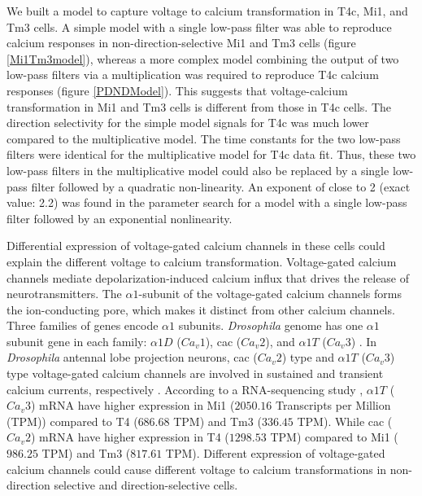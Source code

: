 \documentclass[9pt,lineno]{elife}
\begin{document}
We built a model to capture voltage to calcium transformation in T4c, Mi1, and Tm3 cells. A simple model with a single low-pass filter was able to reproduce calcium responses in non-direction-selective Mi1 and Tm3 cells (figure \ref{Mi1Tm3model}), whereas a more complex model combining the output of two low-pass filters via a multiplication was required to reproduce T4c calcium responses (figure \ref{PDNDModel}). This suggests that voltage-calcium transformation in Mi1 and Tm3 cells is different from those in T4c cells. The direction selectivity for the simple model signals for T4c was much lower compared to the multiplicative model. The time constants for the two low-pass filters were identical for the multiplicative model for T4c data fit. Thus, these two low-pass filters in the multiplicative model could also be replaced by a single low-pass filter followed by a quadratic non-linearity. An exponent of close to 2 (exact value: 2.2) was found in the parameter search for a model with a single low-pass filter followed by an exponential nonlinearity.  


Differential expression of voltage-gated calcium channels in these cells could explain the different voltage to calcium transformation. Voltage-gated calcium channels mediate depolarization-induced calcium influx that drives the release of neurotransmitters. The $\alpha1$-subunit of the voltage-gated calcium channels forms the ion-conducting pore, which makes it distinct from other calcium channels. Three families of genes encode $\alpha1$ subunits. \textit{Drosophila} genome has one $\alpha1$ subunit gene in each family: $\alpha1D$ ($Ca_{v}1$), cac ($Ca_{v}2$), and $\alpha1T$ ($Ca_{v}3$) \parencite{Littleton2000, King2007}. In \textit{Drosophila} antennal lobe projection neurons, cac ($Ca_{v}2$) type and $\alpha1T$ ($Ca_{v}3$) type voltage-gated calcium channels are involved in sustained and transient calcium currents, respectively \parencite{Gu2009, Iniguez2013}. According to a RNA-sequencing study \parencite{Davis2020}, $\alpha1T$ ($Ca_{v}3$) mRNA have higher expression in Mi1 ($2050.16$ Transcripts per Million (TPM)) compared to T4 ($686.68$ TPM) and Tm3 ($336.45$ TPM). While cac ($Ca_{v}2$) mRNA have higher expression in T4 ($1298.53$ TPM) compared to Mi1 ($986.25$ TPM) and Tm3 ($817.61$ TPM). Different expression of voltage-gated calcium channels could cause different voltage to calcium transformations in non-direction selective and direction-selective cells.
\end{document}
